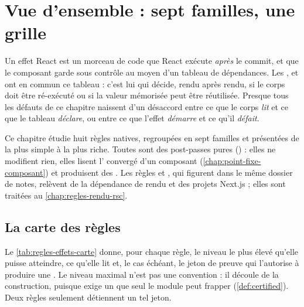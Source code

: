 \section{Vue d'ensemble : sept familles, une grille}
\label{sec:regles-effets-grille}

Un effet React est un morceau de code que React exécute \emph{après} le commit, et que le composant garde sous contrôle au moyen d'un tableau de dépendances. Les ,  et  ont en commun ce tableau : c'est lui qui décide, rendu après rendu, si le corps doit être ré-exécuté ou si la valeur mémorisée peut être réutilisée. Presque tous les défauts de ce chapitre naissent d'un désaccord entre ce que le corps \emph{lit} et ce que le tableau \emph{déclare}, ou entre ce que l'effet \emph{démarre} et ce qu'il \emph{défait}.

Ce chapitre étudie huit règles natives, regroupées en sept familles et présentées de la plus simple à la plus riche. Toutes sont des post-passes pures () : elles ne modifient rien, elles lisent l' convergé d'un composant (\cref{chap:point-fixe-composant}) et produisent des . Les règles  et , qui figurent dans le même dossier de notes, relèvent de la dépendance de rendu et des projets Next.js ; elles sont traitées au \cref{chap:regles-rendu-rsc}.

\subsection{La carte des règles}

Le \cref{tab:regles-effets-carte} donne, pour chaque règle, le niveau le plus élevé qu'elle puisse atteindre, ce qu'elle lit et, le cas échéant, le jeton de preuve qui l'autorise à produire une \Error. Le niveau maximal n'est pas une convention : il découle de la construction, puisque  exige un  que seul le module  peut frapper (\cref{def:certified}). Deux règles seulement détiennent un tel jeton.

